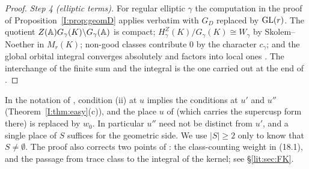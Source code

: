 \begin{proof}
\emph{Step 4 (elliptic terms).} For regular elliptic $\gamma$ the computation in the proof of Proposition~\ref{I:prop:geomD} applies verbatim with $G_D$ replaced by $\mathrm{GL}(r)$. The quotient $Z(\mathbb{A})G_\gamma(K)\backslash G_\gamma(\mathbb{A})$ is compact; $H^Z_\gamma(K)/G_\gamma(K)\cong W_\gamma$ by Skolem--Noether in $M_r(K)$; non-good classes contribute $0$ by the character $c_\gamma$; and the global orbital integral converges absolutely and factors into local ones \cite[\S\S6, 18]{FK86} \Ev. The interchange of the finite sum and the integral is the one carried out at the end of \cite[\S18]{FK86}.
\end{proof}

\begin{remark}
In the notation of \cite[\S18, Theorem]{FK86}, condition (ii) at $u$ implies the conditions at $u'$ and $u''$ (Theorem~\ref{I:thm:easy}(c)), and the place $u$ of \cite{FK86} (which carries the supercusp form there) is replaced by $w_0$. In particular $u''$ need not be distinct from $u'$, and a single place of $S$ suffices for the geometric side. We use $|S|\ge2$ only to know that $S\neq\emptyset$. The proof also corrects two points of \cite[\S18]{FK86}: the class-counting weight in (18.1), and the passage from trace class to the integral of the kernel; see \S\ref{lit:sec:FK}.
\end{remark}

